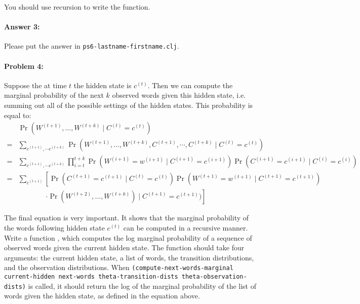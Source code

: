 \documentclass[10pt]{article}
\newcommand{\required}[1]{{\color{blue}{#1}}}
\newcommand{\PSnum}{6}
\begin{document}
You should use recursion to write the function. 

\paragraph{Answer 3:} Please put the answer in
\texttt{ps\PSnum-lastname-firstname.clj}.

\hrulefill%

\paragraph{Problem 4:}

Suppose the at time $t$ the hidden state is $c^{(t)}$. Then we can
compute the marginal probability of the next $k$ observed words
given this hidden state, i.e. summing out all of the possible settings
of the hidden states. This probability is equal to:
\begin{align*}
&\Pr(W^{(t+1)},\dots,W^{(t+k)} \mid C^{(t)}=c^{(t)} )\\ 
=& \sum_{c^{(t+1)},\cdots c^{(t+k)}} 
 \Pr(W^{(t+1)},\dots,W^{(t+k)},C^{(t+1)},\cdots,C^{(t+k)} \mid C^{(t)}=c^{(t)} ) \\
=& \sum_{c^{(t+1)},\cdots c^{(t+k)}} 
 \prod_{i=t}^{t+k} \Pr(W^{(i+1)}=w^{(i+1)} \mid C^{(i+1)}=c^{(i+1)}) \Pr(C^{(i+1)} =c^{(i+1)}\mid C^{(i)}=c^{(i)}) \\ 
= & \sum_{c^{(t+1)}}\left[ 
  \Pr(C^{(t+1)} =c^{(t+1)}\mid C^{(t)}=c^{(t)}) \Pr(W^{(t+1)} =w^{(t+1)}\mid C^{(t+1)}=c^{(t+1)})\right. \\
 &\phantom{\sum_{c^{(t+1)}}\ }\left.\cdot \Pr(W^{(t+2)},\dots,W^{(t+k)}) \mid C^{(t+1)}=c^{(t+1)} )\right]
\end{align*}

The final equation is very important. It shows that the marginal
probability of the words following hidden state $c^{(t)}$ can be
computed in a recursive manner. Write a function
\required{\texttt{compute-next-words-marginal}}, which computes the log marginal
probability of a sequence of observed words given the current hidden
state. The function should take four arguments: the current hidden
state, a list of words, the transition distributions, and the
observation distributions. When \texttt{(compute-next-words-marginal
  current-hidden next-words theta-transition-dists
  theta-observation-dists)} is called, it should return the log of the
marginal probability of the list of words given the hidden state, as
defined in the equation above.
\end{document}
